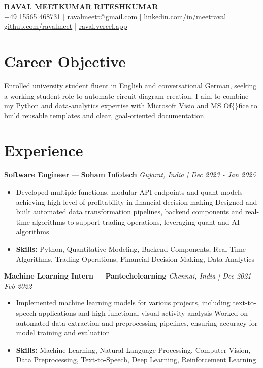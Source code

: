 \documentclass[a4paper,10pt]{article}
\begin{document}
\begin{center}
  {\Large\bfseries RAVAL MEETKUMAR RITESHKUMAR}\\[2pt]
  {\small +49 15565 468731 \;|\; \href{mailto:ravalmeett@gmail.com}{ravalmeett@gmail.com} \;|\; \href{https://www.linkedin.com/in/meetraval/}{linkedin.com/in/meetraval} \;|\; \href{https://github.com/ravalmeet}{github.com/ravalmeet} \;|\; \href{https://raval.vercel.app/}{raval.vercel.app}}
\end{center}
\vspace{-3pt}

\section*{Career Objective}
Enrolled university student fluent in English and conversational German, seeking a working-student role to automate circuit diagram creation. I aim to combine my Python and data-analytics expertise with Microsoft Visio and MS Of\{\}fice to build reusable templates and clear, goal-oriented documentation.\par

\section*{Experience}
\textbf{Software Engineer} — \textbf{Soham Infotech} \hfill \textit{Gujarat, India \;|\; Dec 2023 - Jan 2025}\par
\vspace{1pt}
\begin{itemize}
  \item Developed multiple functions, modular API endpoints and quant models achieving high level of profitability in financial decision-making Designed and built automated data transformation pipelines, backend components and real-time algorithms to support trading operations, leveraging quant and AI algorithms
  \item \textbf{Skills:} Python, Quantitative Modeling, Backend Components, Real-Time Algorithms, Trading Operations, Financial Decision-Making, Data Analytics
\end{itemize}
\vspace{3pt}
\textbf{Machine Learning Intern} — \textbf{Pantechelearning} \hfill \textit{Chennai, India \;|\; Dec 2021 - Feb 2022}\par
\vspace{1pt}
\begin{itemize}
  \item Implemented machine learning models for various projects, including text-to-speech applications and high functional visual-activity analysis Worked on automated data extraction and preprocessing pipelines, ensuring accuracy for model training and evaluation
  \item \textbf{Skills:} Machine Learning, Natural Language Processing, Computer Vision, Data Preprocessing, Text-to-Speech, Deep Learning, Reinforcement Learning
\end{itemize}
\end{document}
